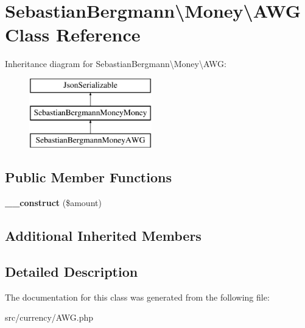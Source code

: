 \hypertarget{classSebastianBergmann_1_1Money_1_1AWG}{}\section{Sebastian\+Bergmann\textbackslash{}Money\textbackslash{}A\+W\+G Class Reference}
\label{classSebastianBergmann_1_1Money_1_1AWG}
Inheritance diagram for Sebastian\+Bergmann\textbackslash{}Money\textbackslash{}A\+W\+G\+:\begin{figure}[H]
\begin{center}
\leavevmode
\includegraphics[height=3.000000cm]{classSebastianBergmann_1_1Money_1_1AWG}
\end{center}
\end{figure}
\subsection*{Public Member Functions}
\begin{DoxyCompactItemize}
\item 
\hypertarget{classSebastianBergmann_1_1Money_1_1AWG_ac75cbea9ff40a8f8f61fdcce17bb1d6d}{}{\bfseries \+\_\+\+\_\+construct} (\$amount)\label{classSebastianBergmann_1_1Money_1_1AWG_ac75cbea9ff40a8f8f61fdcce17bb1d6d}

\end{DoxyCompactItemize}
\subsection*{Additional Inherited Members}


\subsection{Detailed Description}


The documentation for this class was generated from the following file\+:\begin{DoxyCompactItemize}
\item 
src/currency/A\+W\+G.\+php\end{DoxyCompactItemize}
